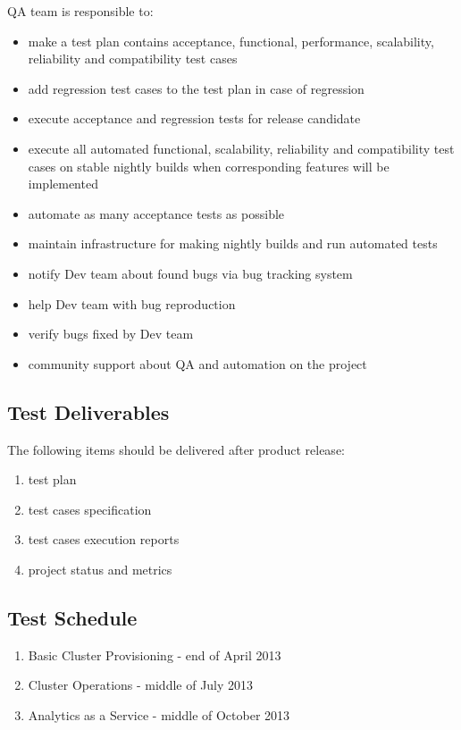 \documentclass[a4paper,11pt]{article}
\begin{document}
QA team is responsible to:
\begin{itemize}
\item make a test plan contains acceptance, functional, performance, scalability, reliability and compatibility test cases
\item add regression test cases to the test plan in case of regression
\item execute acceptance and regression tests for release candidate
\item execute all automated functional, scalability, reliability and compatibility test cases on stable nightly builds when corresponding features will be implemented
\item automate as many acceptance tests as possible
\item maintain infrastructure for making nightly builds and run automated tests
\item notify Dev team about found bugs via bug tracking system
\item help Dev team with bug reproduction
\item verify bugs fixed by Dev team
\item community support about QA and automation on the project
\end{itemize}

\subsection{Test Deliverables}
The following items should be delivered after product release:
\begin{enumerate}
\item test plan
\item test cases specification
\item test cases execution reports
\item project status and metrics
\end{enumerate}

\subsection{Test Schedule}
\begin{enumerate}
\item Basic Cluster Provisioning - end of April 2013
\item Cluster Operations - middle of July 2013
\item Analytics as a Service - middle of October 2013 
\end{enumerate}
\end{document}
